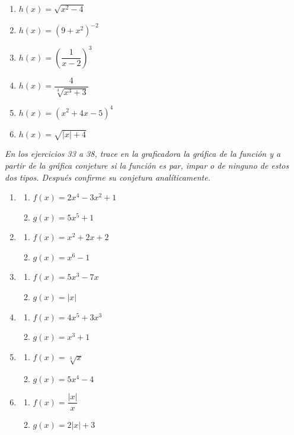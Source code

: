 \documentclass[12pt]{article}
\theoremstyle{remark}
\begin{document}
\begin{enumerate}[start=27]
\item $h(x)=\sqrt{x^2-4}$
\item $h(x)=(9+x^2)^{-2}$
\item $h(x)=\left(\dfrac1{x-2}\right)^3$
\item $h(x)=\dfrac4{\sqrt[3]{x^3+3}}$
\item $h(x)=(x^2+4x-5)^4$
\item $h(x)=\sqrt{|x|+4}$
\end{enumerate}

\textit{En los ejercicios 33 a 38, trace en la graficadora la gráfica de la función y a partir de la gráfica conjeture si la función es par, impar o de ninguno de estos dos tipos. Después confirme su conjetura analíticamente.}

\begin{enumerate}[start=33]
\item \begin{enumerate}[label=(\alph*)]\item $f(x)=2x^4-3x^2+1$ \item $g(x)=5x^5+1$\end{enumerate}
\item \begin{enumerate}[label=(\alph*)]\item $f(x)=x^2+2x+2$ \item $g(x)=x^6-1$\end{enumerate}
\item \begin{enumerate}[label=(\alph*)]\item $f(x)=5x^3-7x$ \item $g(x)=|x|$\end{enumerate}
\item \begin{enumerate}[label=(\alph*)]\item $f(x)=4x^5+3x^3$ \item $g(x)=x^3+1$\end{enumerate}
\item \begin{enumerate}[label=(\alph*)]\item $f(x)=\sqrt[3]{x}$ \item $g(x)=5x^4-4$\end{enumerate}
\item \begin{enumerate}[label=(\alph*)]\item $f(x)=\dfrac{|x|}{x}$ \item $g(x)=2|x|+3$\end{enumerate}
\end{enumerate}
\end{document}
